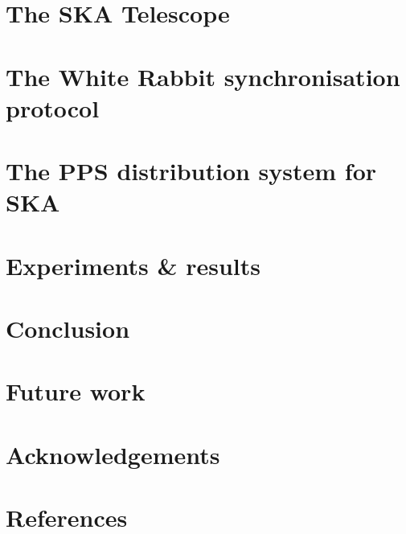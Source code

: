 \documentclass[review]{elsarticle}
\begin{document}


%

\section{The SKA Telescope} \label{sec:ska}



\section{The White Rabbit synchronisation protocol} \label{sec:wr}



\section{The PPS distribution system for SKA} \label{sec:ska-pps-system}



\section{Experiments \& results} \label{sec:experiments}



\section{Conclusion} \label{sec:conclusion}



\section{Future work} \label{sec:future-work}



\section{Acknowledgements} \label{sec:acknowledgments}



\section*{References}\label{sec:references}


\end{document}
